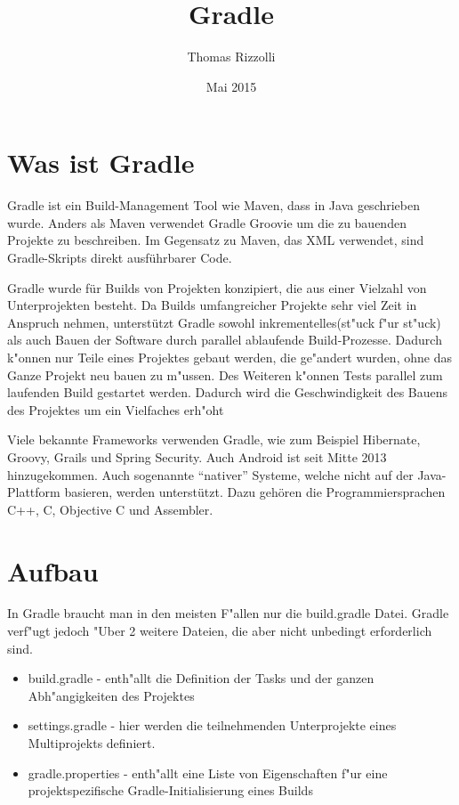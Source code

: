 \title{Gradle}
\author{Thomas Rizzolli}
\date{Mai 2015}

\maketitle

\section{Was ist Gradle}
Gradle ist ein Build-Management Tool wie Maven, dass in Java geschrieben wurde. Anders als Maven verwendet Gradle Groovie um die zu bauenden Projekte zu beschreiben. Im Gegensatz zu Maven, das XML verwendet, sind Gradle-Skripts direkt ausführbarer Code.

Gradle wurde für Builds von Projekten konzipiert, die aus einer Vielzahl von Unterprojekten besteht.
Da Builds umfangreicher Projekte sehr viel Zeit in Anspruch nehmen, unterstützt Gradle sowohl inkrementelles(st"uck f"ur st"uck) als auch Bauen der Software durch parallel ablaufende Build-Prozesse. Dadurch k"onnen nur Teile eines Projektes gebaut werden, die ge"andert wurden, ohne das Ganze Projekt neu bauen zu m"ussen. Des Weiteren k"onnen Tests parallel zum laufenden Build gestartet werden. Dadurch wird die Geschwindigkeit des Bauens des Projektes um ein Vielfaches erh"oht

Viele bekannte Frameworks verwenden Gradle, wie zum Beispiel Hibernate, Groovy, Grails und Spring Security. Auch Android ist seit Mitte 2013 hinzugekommen. Auch sogenannte ``nativer'' Systeme, welche nicht auf der Java-Plattform basieren, werden unterstützt. Dazu gehören die Programmiersprachen C++, C, Objective C und Assembler.

\section{Aufbau}
In Gradle braucht man in den meisten F"allen nur die build.gradle Datei. Gradle verf"ugt jedoch "Uber 2 weitere Dateien, die aber nicht unbedingt erforderlich sind.
\begin{itemize}
\item build.gradle - enth"allt die Definition der Tasks und der ganzen Abh"angigkeiten des Projektes
\item settings.gradle - hier werden die teilnehmenden Unterprojekte eines Multiprojekts definiert.
\item gradle.properties - enth"allt eine Liste von Eigenschaften f"ur eine projektspezifische Gradle-Initialisierung eines Builds
\end{itemize}

